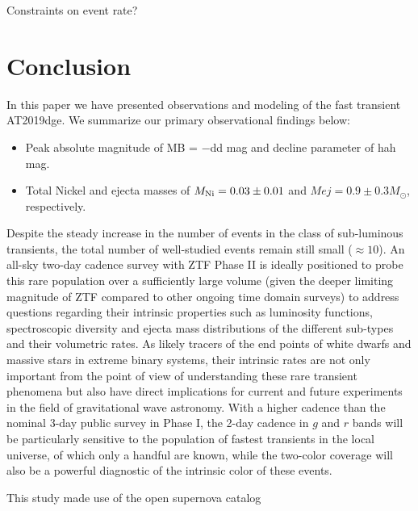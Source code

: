 \documentclass[twocolumn]{aastex63}
\begin{document}
\begin{CJK*}{UTF8}{gbsn}
Constraints on event rate?

\section{Conclusion}
In this paper we have presented observations and modeling of the fast transient AT2019dge. We 
summarize our primary observational findings below:
\begin{itemize}
	\item Peak absolute magnitude of MB = −dd mag and decline parameter of hah mag.
	\item  Total Nickel and ejecta masses of $M_{\rm Ni} = 0.03 \pm 0.01$ and $Mej = 0.9 \pm 0.3 
	M_\odot$, respectively.
\end{itemize}


Despite the steady increase in the number of events in the class of sub-luminous transients, the total 
number of well-studied events remain still small ($\approx 10$). An all-sky two-day cadence survey 
with ZTF Phase II is ideally positioned to probe this rare population over a sufficiently large volume 
(given the deeper limiting magnitude of ZTF compared to other ongoing time domain surveys) to 
address questions regarding their intrinsic properties such as luminosity functions, spectroscopic 
diversity and ejecta mass distributions of the different sub-types and their volumetric rates. As likely 
tracers of the end points of white dwarfs and massive stars in extreme binary systems, their intrinsic 
rates are not only important from the point of view of understanding these rare transient phenomena 
but also have direct implications for current and future experiments in the field of gravitational wave 
astronomy. With a higher cadence than the nominal 3-day public survey in Phase I, the 2-day cadence 
in $g$ and $r$ bands will be particularly sensitive to the population of fastest transients in the local 
universe, of which only a handful are known, while the two-color coverage will also be a powerful 
diagnostic of the intrinsic color of these events.


\acknowledgements

This study made use of the open supernova catalog \citep{Guillochon2017}



\end{CJK*}
\end{document}
